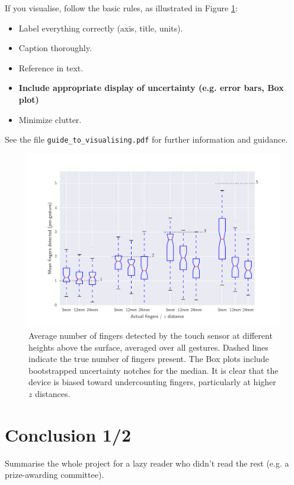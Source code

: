 \documentclass{l4proj}
\begin{document}
If you visualise, follow the basic rules, as illustrated in Figure \ref{fig:boxplot}:
\begin{itemize}
\item Label everything correctly (axis, title, units).
\item Caption thoroughly.
\item Reference in text.
\item \textbf{Include appropriate display of uncertainty (e.g. error bars, Box plot)}
\item Minimize clutter.
\end{itemize}

See the file \texttt{guide\_to\_visualising.pdf} for further information and guidance.

\begin{figure}
    \centering
    \includegraphics[width=1.0\linewidth]{images/boxplot_finger_distance.pdf}    

    \caption{Average number of fingers detected by the touch sensor at different heights above the surface, averaged over all gestures. Dashed lines indicate
    the true number of fingers present. The Box plots include bootstrapped uncertainty notches for the median. It is clear that the device is biased toward 
    undercounting fingers, particularly at higher $z$ distances.
    }

    \label{fig:boxplot} 
\end{figure}


\chapter{Conclusion 1/2}    
Summarise the whole project for a lazy reader who didn't read the rest (e.g. a prize-awarding committee).
\end{document}
